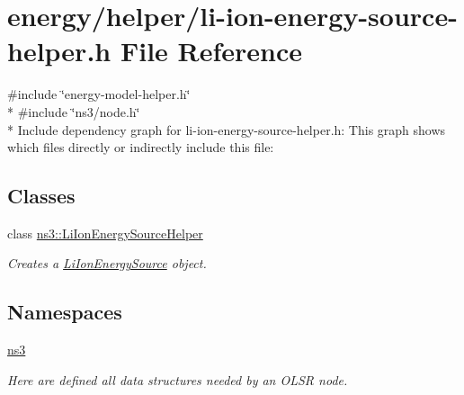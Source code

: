 \hypertarget{li-ion-energy-source-helper_8h}{}\section{energy/helper/li-\/ion-\/energy-\/source-\/helper.h File Reference}
\label{li-ion-energy-source-helper_8h}
{\ttfamily \#include \char`\"{}energy-\/model-\/helper.\+h\char`\"{}}\\*
{\ttfamily \#include \char`\"{}ns3/node.\+h\char`\"{}}\\*
Include dependency graph for li-\/ion-\/energy-\/source-\/helper.h\+:
This graph shows which files directly or indirectly include this file\+:
\subsection*{Classes}
\begin{DoxyCompactItemize}
\item 
class \hyperlink{classns3_1_1LiIonEnergySourceHelper}{ns3\+::\+Li\+Ion\+Energy\+Source\+Helper}
\begin{DoxyCompactList}\small\item\em Creates a \hyperlink{classns3_1_1LiIonEnergySource}{Li\+Ion\+Energy\+Source} object. \end{DoxyCompactList}\end{DoxyCompactItemize}
\subsection*{Namespaces}
\begin{DoxyCompactItemize}
\item 
 \hyperlink{namespacens3}{ns3}
\begin{DoxyCompactList}\small\item\em Here are defined all data structures needed by an O\+L\+SR node. \end{DoxyCompactList}\end{DoxyCompactItemize}
